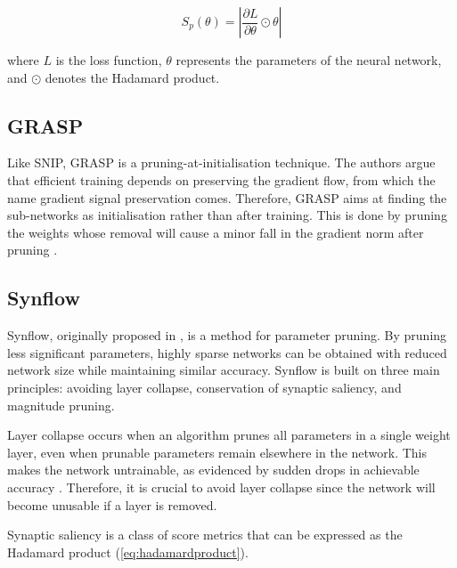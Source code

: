 \begin{equation}
S_p(\theta) = \left|\frac{\partial L}{\partial \theta} \odot \theta\right|
\end{equation}

where $L$ is the loss function, \(\theta \) represents the parameters of the neural network, and \(\odot\) denotes the Hadamard product.

\subsection{GRASP}
Like \gls{SNIP}, \gls{GRASP} is a pruning-at-initialisation technique. The authors argue that efficient training depends on preserving the gradient flow, from which the name gradient signal preservation comes. Therefore, \gls{GRASP} aims at finding the sub-networks as initialisation rather than after training. This is done by pruning the weights whose removal will cause a minor fall in the gradient norm after pruning \autocite{wang2020picking}. 


\subsection{Synflow}
\gls{Synflow}, originally proposed in \autocite{tanaka2020pruning}, is a method for parameter pruning. By pruning less significant parameters, highly sparse networks can be obtained with reduced network size while maintaining similar accuracy. \gls{Synflow} is built on three main principles: avoiding layer collapse, conservation of synaptic saliency, and magnitude pruning.

\noindent Layer collapse occurs when an algorithm prunes all parameters in a single weight layer, even when prunable parameters remain elsewhere in the network. This makes the network untrainable, as evidenced by sudden drops in achievable accuracy \autocite{tanaka2020pruning}. Therefore, it is crucial to avoid layer collapse since the network will become unusable if a layer is removed.

\noindent Synaptic saliency is a class of score metrics that can be expressed as the Hadamard product (\cref{eq:hadamardproduct}).

